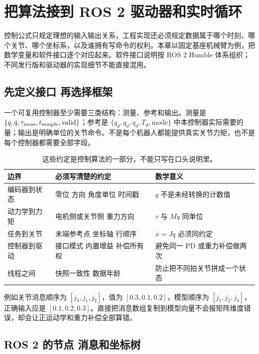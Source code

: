 \chapter{把算法接到 ROS 2 驱动器和实时循环}
\label{ch:software}

控制公式只规定理想的输入输出关系，工程实现还必须规定数据属于哪个时刻、哪个关节、哪个坐标系，以及谁拥有写命令的权利。本章以固定基座机械臂为例，把数学变量和软件接口逐个对应起来。软件接口说明按 ROS 2 Humble 体系组织；不同发行版和驱动器的实现细节不能直接混用。

\section{先定义接口 再选择框架}

一个可复用控制器至少需要三类结构：测量、参考和输出。测量是 $\{q,\dot q,\tau_{\rm meas},t_{\rm sample},\mathrm{valid}\}$；参考是 $\{q_d,\dot q_d,\ddot q_d,T_d,\mathrm{mode}\}$ 中本控制器实际需要的量；输出是明确单位的关节命令。不是每个机器人都能提供真实关节力矩，也不是每个控制器都需要全部字段。

\begin{table}[htbp]\centering\small
\begin{tabularx}{\linewidth}{p{28mm}XX}\toprule
边界 & 必须写清楚的约定 & 数学意义\\\midrule
编码器到状态 & 零位 方向 角度单位 时间戳 & $q$ 不是未经转换的计数值\\
动力学到力矩 & 电机侧或关节侧 重力方向 & $\tau$ 与 $M\ddot q$ 同单位\\
任务到关节 & 末端参考点 坐标轴 行顺序 & $\dot x=J\dot q$ 必须同约定\\
控制器到驱动 & 接口模式 内置增益 补偿所有权 & 避免同一 PD 或重力补偿做两次\\
线程之间 & 快照一致性 数据年龄 & 防止把不同拍关节拼成一个状态\\\bottomrule
\end{tabularx}
\caption{这些约定是控制算法的一部分，不能只写在口头说明里。}
\end{table}

例如关节消息顺序为 $[j_3,j_1,j_2]$，值为 $[0.3,0.1,0.2]$，模型顺序为 $[j_1,j_2,j_3]$，正确输入应是 $[0.1,0.2,0.3]$。直接把消息数组复制到模型向量不会报矩阵维度错误，却会让正运动学和重力补偿全部算错。

\section{ROS 2 的节点 消息和坐标树}

